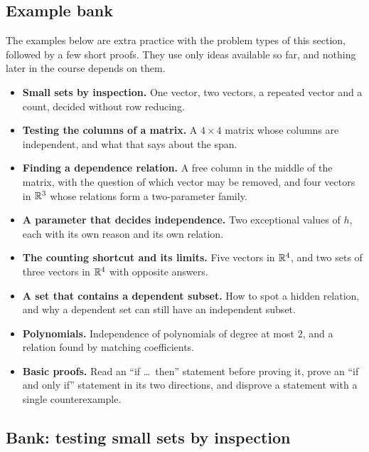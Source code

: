 \documentclass[11pt]{article}
\begin{document}
\subsection*{Example bank}

The examples below are extra practice with the problem types of this section, followed by a few short proofs. They use only ideas available so far, and nothing later in the course depends on them.

\begin{remark}
\begin{itemize}
  \item \textbf{Small sets by inspection.} One vector, two vectors, a repeated vector and a count, decided without row reducing.
  \item \textbf{Testing the columns of a matrix.} A $4\times4$ matrix whose columns are independent, and what that says about the span.
  \item \textbf{Finding a dependence relation.} A free column in the middle of the matrix, with the question of which vector may be removed, and four vectors in $\mathbb{R}^3$ whose relations form a two-parameter family.
  \item \textbf{A parameter that decides independence.} Two exceptional values of $h$, each with its own reason and its own relation.
  \item \textbf{The counting shortcut and its limits.} Five vectors in $\mathbb{R}^4$, and two sets of three vectors in $\mathbb{R}^4$ with opposite answers.
  \item \textbf{A set that contains a dependent subset.} How to spot a hidden relation, and why a dependent set can still have an independent subset.
  \item \textbf{Polynomials.} Independence of polynomials of degree at most $2$, and a relation found by matching coefficients.
  \item \textbf{Basic proofs.} Read an ``if \dots\ then'' statement before proving it, prove an ``if and only if'' statement in its two directions, and disprove a statement with a single counterexample.
\end{itemize}
\end{remark}

\subsection*{Bank: testing small sets by inspection}
\end{document}
